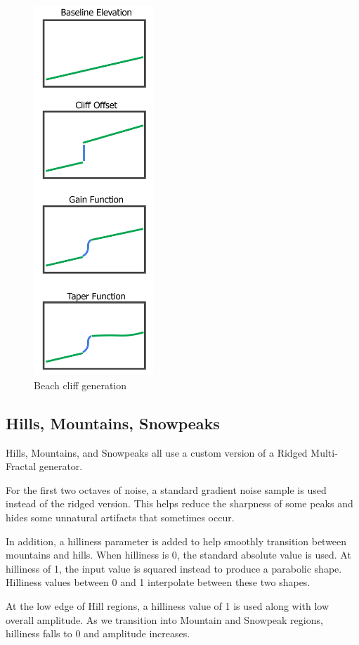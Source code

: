 \begin{figure}
  \centering
    \includegraphics[width=0.4\textwidth]{figures/beachcliffs}
  \caption{Beach cliff generation}
  \label{fig:beach_cliffs}
\end{figure}

\subsection{Hills, Mountains, Snowpeaks}

Hills, Mountains, and Snowpeaks all use a custom version of a Ridged Multi-Fractal generator.

For the first two octaves of noise, a standard gradient noise sample is used instead of the ridged version.
This helps reduce the sharpness of some peaks and hides some unnatural artifacts that sometimes occur.

In addition, a hilliness parameter is added to help smoothly transition between mountains and hills.
When hilliness is 0, the standard absolute value is used.
At hilliness of 1, the input value is squared instead to produce a parabolic shape.
Hilliness values between 0 and 1 interpolate between these two shapes.

At the low edge of Hill regions, a hilliness value of 1 is used along with low overall amplitude.
As we transition into Mountain and Snowpeak regions, hilliness falls to 0 and amplitude increases.
